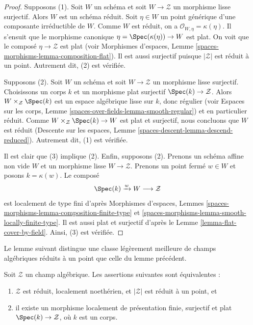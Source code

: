\begin{proof}
Supposons (1). Soit $W$ un schéma et
soit $W \to \mathcal{Z}$ un morphisme lisse surjectif. Alors $W$ est
un schéma réduit. Soit $\eta \in W$ un point générique d'une composante
irréductible de $W$. Comme $W$ est réduit, on a
$\mathcal{O}_{W, \eta} = \kappa(\eta)$. Il s'ensuit que le morphisme canonique
$\eta = \Spec(\kappa(\eta)) \to W$ est plat. On voit que le
composé $\eta \to \mathcal{Z}$ est plat (voir
Morphismes d'espaces, Lemme \ref{spaces-morphisms-lemma-composition-flat}).
Il est aussi surjectif puisque $|\mathcal{Z}|$ est réduit à un point. Autrement dit,
(2) est vérifiée.

\medskip\noindent
Supposons (2). Soit $W$ un schéma et
soit $W \to \mathcal{Z}$ un morphisme lisse surjectif. Choisissons un corps
$k$ et un morphisme plat surjectif $\Spec(k) \to \mathcal{Z}$.
Alors $W \times_\mathcal{Z} \Spec(k)$ est un espace algébrique lisse
sur $k$, donc régulier (voir
Espaces sur les corps, Lemme \ref{spaces-over-fields-lemma-smooth-regular})
et en particulier réduit. Comme $W \times_\mathcal{Z} \Spec(k) \to W$
est plat et surjectif, nous concluons que $W$ est réduit
(Descente sur les espaces, Lemme \ref{spaces-descent-lemma-descend-reduced}).
Autrement dit, (1) est vérifiée.

\medskip\noindent
Il est clair que (3) implique (2). Enfin, supposons (2). Prenons un schéma affine
non vide $W$ et un morphisme lisse $W \to \mathcal{Z}$. Prenons un point fermé
$w \in W$ et posons $k = \kappa(w)$. Le composé
$$
\Spec(k) \xrightarrow{w} W \longrightarrow \mathcal{Z}
$$
est localement de type fini d'après
Morphismes d'espaces, Lemmes
\ref{spaces-morphisms-lemma-composition-finite-type} et
\ref{spaces-morphisms-lemma-smooth-locally-finite-type}.
Il est aussi plat et surjectif d'après le
Lemme \ref{lemma-flat-cover-by-field}.
Ainsi, (3) est vérifiée.
\end{proof}

\noindent
Le lemme suivant distingue une classe légèrement meilleure de champs algébriques
réduits à un point que celle du lemme précédent.

\begin{lemma}
\label{lemma-unique-point-better}
Soit $\mathcal{Z}$ un champ algébrique. Les assertions suivantes sont équivalentes :
\begin{enumerate}
\item $\mathcal{Z}$ est réduit, localement noethérien, et $|\mathcal{Z}|$
est réduit à un point, et
\item il existe un morphisme localement de présentation finie, surjectif et plat
$\Spec(k) \to \mathcal{Z}$, où $k$ est un corps.
\end{enumerate}
\end{lemma}

